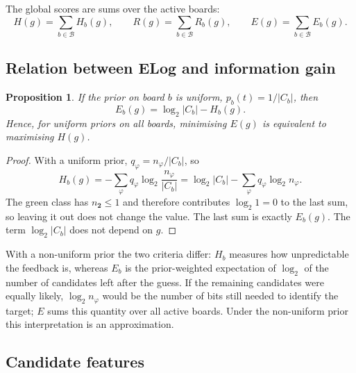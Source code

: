 \documentclass[11pt,a4paper]{article}
\newtheorem{proposition}{Proposition}
\theoremstyle{definition}
\theoremstyle{remark}
\newcommand{\B}{\mathcal{B}}
\newcommand{\green}{\mathbf{2}}
\begin{document}
The global scores are sums over the active boards:
\[
  H(g) = \sum_{b \in \B} H_b(g), \qquad
  R(g) = \sum_{b \in \B} R_b(g), \qquad
  E(g) = \sum_{b \in \B} E_b(g).
\]

\subsection{Relation between ELog and information gain}

\begin{proposition}
\label{prop:uniform}
If the prior on board $b$ is uniform, $p_b(t) = 1/|C_b|$, then
\[
  E_b(g) = \log_2 |C_b| - H_b(g).
\]
Hence, for uniform priors on all boards, minimising $E(g)$ is equivalent to maximising $H(g)$.
\end{proposition}

\begin{proof}
With a uniform prior, $q_\varphi = n_\varphi / |C_b|$, so
\[
  H_b(g) = -\sum_\varphi q_\varphi \log_2 \frac{n_\varphi}{|C_b|}
         = \log_2 |C_b| - \sum_\varphi q_\varphi \log_2 n_\varphi .
\]
The green class has $n_{\green} \le 1$ and therefore contributes $\log_2 1 = 0$
to the last sum, so leaving it out does not change the value.
The last sum is exactly $E_b(g)$.
The term $\log_2|C_b|$ does not depend on $g$.
\end{proof}

With a non-uniform prior the two criteria differ:
$H_b$ measures how unpredictable the feedback is, whereas $E_b$ is the
prior-weighted expectation of $\log_2$ of the number of candidates left after the guess.
If the remaining candidates were equally likely, $\log_2 n_\varphi$ would be the number of
bits still needed to identify the target; $E$ sums this quantity over all active boards.
Under the non-uniform prior this interpretation is an approximation.

\subsection{Candidate features}
\end{document}
